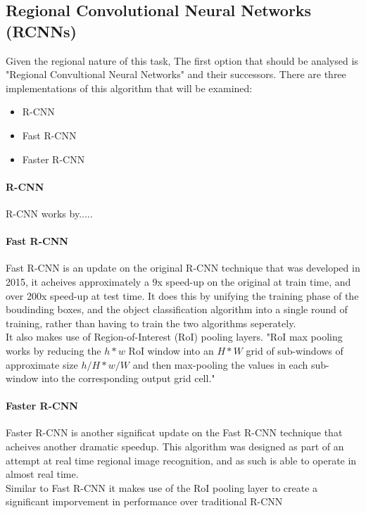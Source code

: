 \documentclass[10pt]{article}
\begin{document}
\subsection{Regional Convolutional Neural Networks (RCNNs)}
	Given the regional nature of this task, The first option that should be analysed is "Regional Convultional Neural Networks" and their successors. There are three implementations of this algorithm that will be examined:
	\begin{itemize}
		\item R-CNN
		\item Fast R-CNN \cite{fast_rcnn}
		\item Faster R-CNN \cite{faster_rcnn}
	\end{itemize}
	
\paragraph{R-CNN}
R-CNN works by.....

\paragraph{Fast R-CNN}
Fast R-CNN \cite{fast_rcnn} is an update on the original R-CNN technique that was developed in 2015, it acheives approximately a 9x speed-up on the original at train time, and over 200x speed-up at test time. It does this by unifying the training phase of the boudinding boxes, and the object classification algorithm into a single round of training, rather than having to train the two algorithms seperately. \\
It also makes use of Region-of-Interest (RoI) pooling layers. "RoI max pooling works by reducing the $h*w$ RoI window into an $H*W$ grid of sub-windows of approximate size $h/H * w/W$ and then max-pooling the values in each sub-window into the corresponding output grid cell."\cite{fast_rcnn}

\paragraph{Faster R-CNN}
Faster R-CNN \cite{faster_rcnn} is another significat update on the Fast R-CNN technique that acheives another dramatic speedup. This algorithm was designed as part of an attempt at real time regional image recognition, and as such is able to operate in almost real time. \\
Similar to Fast R-CNN it makes use of the RoI pooling layer to create a significant imporvement in performance over traditional R-CNN
	
\end{document}
